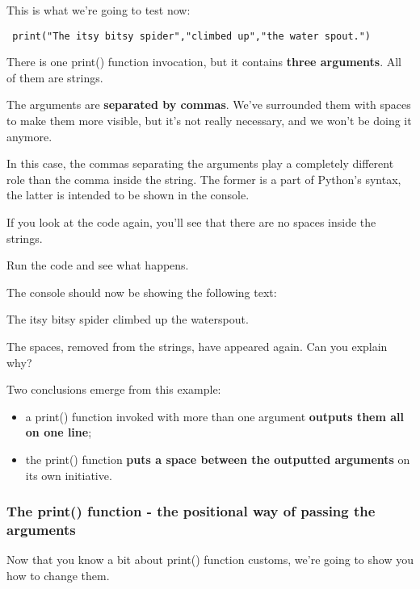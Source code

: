 \documentclass[a4paper,10pt]{article}
\begin{document}
This is what we're going to test now:
\begin{verbatim}
 print("The itsy bitsy spider","climbed up","the water spout.")
\end{verbatim}


There is one {\selectfont print()} function invocation, but it contains \textbf{three arguments}. All of them are strings.
\newline

The arguments are \textbf{separated by commas}. We've surrounded them with spaces to make them more visible, but it's not really necessary, and we won't be doing it anymore.
\newline

In this case, the commas separating the arguments play a completely different role than the comma inside the string. The former is a part of Python's syntax, the latter is intended to be shown in the console.
\newline

If you look at the code again, you'll see that there are no spaces inside the strings.
\newline

Run the code and see what happens.
\newline

The console should now be showing the following text:


{\selectfont The itsy bitsy spider climbed up the waterspout.}
\newline

The spaces, removed from the strings, have appeared again. Can you explain why?
\newline

Two conclusions emerge from this example:
\begin{itemize}
 \item a {\selectfont print()} function invoked with more than one argument \textbf{outputs them all on one line};
 \item the {\selectfont print()} function \textbf{puts a space between the outputted arguments} on its own initiative.
\end{itemize}

\subsubsection{The print() function - the positional way of passing the arguments}
Now that you know a bit about {\selectfont print()} function customs, we're going to show you how to change them.
\newline
\end{document}

